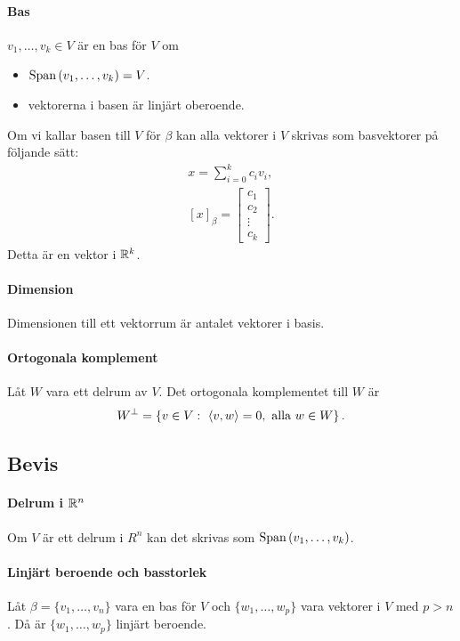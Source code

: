 \paragraph{Bas}
$v_1, \dots, v_k\in V$ är en bas för $V$ om
\begin{itemize}
	\item $\text{Span}\left(v_1, \dots, v_k\right) = V$.
	\item vektorerna i basen är linjärt oberoende.
\end{itemize}
Om vi kallar basen till $V$ för $\beta$ kan alla vektorer i $V$ skrivas som basvektorer på följande sätt:
\begin{align*}
	x = \sum\limits_{i = 0}^{k}c_iv_i, \\
	[x]_\beta =
	\left[\begin{array}{c}
		c_1 \\
		c_2 \\
		\vdots \\
		c_k
	\end{array}\right].
\end{align*}
Detta är en vektor i $\mathbb{R}^k$.

\paragraph{Dimension}
Dimensionen till ett vektorrum är antalet vektorer i basis.

\paragraph{Ortogonala komplement}
Låt $W$ vara ett delrum av $V$. Det ortogonala komplementet till $W$ är
\begin{align*}
	W^\perp = \left\{v\in V:\ \expval{v, w} = 0, \text{ alla } w\in W\right\}.
\end{align*}

\subsection{Bevis}

\paragraph{Delrum i $\mathbb{R}^n$}
Om $V$ är ett delrum i $R^n$ kan det skrivas som $\text{Span}\left(v_1, \dots, v_k\right)$.

\proof

\paragraph{Linjärt beroende och basstorlek}
Låt $\beta = \{v_1, \dots, v_n\}$ vara en bas för $V$ och $\{w_1, \dots, w_p\}$ vara vektorer i $V$ med $p > n$. Då är $\{w_1, \dots, w_p\}$ linjärt beroende.

